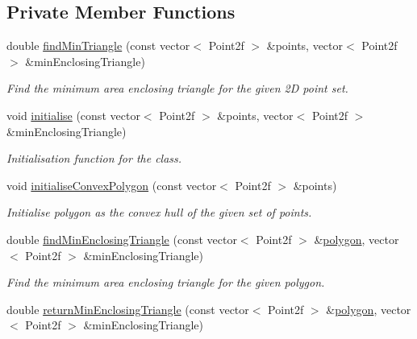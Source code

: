 \subsection*{\-Private \-Member \-Functions}
\begin{DoxyCompactItemize}
\item 
double \hyperlink{classmultiscale_1_1MinEnclosingTriangleFinder_a1540deb145740cb2e73c7c76a9dd244f}{find\-Min\-Triangle} (const vector$<$ \-Point2f $>$ \&points, vector$<$ \-Point2f $>$ \&min\-Enclosing\-Triangle)
\begin{DoxyCompactList}\small\item\em \-Find the minimum area enclosing triangle for the given 2\-D point set. \end{DoxyCompactList}\item 
void \hyperlink{classmultiscale_1_1MinEnclosingTriangleFinder_a6fa2b447626f765d0b9600cabdc810ae}{initialise} (const vector$<$ \-Point2f $>$ \&points, vector$<$ \-Point2f $>$ \&min\-Enclosing\-Triangle)
\begin{DoxyCompactList}\small\item\em \-Initialisation function for the class. \end{DoxyCompactList}\item 
void \hyperlink{classmultiscale_1_1MinEnclosingTriangleFinder_afe8fe342d7ec338ccc0874cce91f2a58}{initialise\-Convex\-Polygon} (const vector$<$ \-Point2f $>$ \&points)
\begin{DoxyCompactList}\small\item\em \-Initialise polygon as the convex hull of the given set of points. \end{DoxyCompactList}\item 
double \hyperlink{classmultiscale_1_1MinEnclosingTriangleFinder_a0b55638741cd5ff84d583df33d594a69}{find\-Min\-Enclosing\-Triangle} (const vector$<$ \-Point2f $>$ \&\hyperlink{classmultiscale_1_1MinEnclosingTriangleFinder_add5aecf2c138345091d55076bdc253a4}{polygon}, vector$<$ \-Point2f $>$ \&min\-Enclosing\-Triangle)
\begin{DoxyCompactList}\small\item\em \-Find the minimum area enclosing triangle for the given polygon. \end{DoxyCompactList}\item 
double \hyperlink{classmultiscale_1_1MinEnclosingTriangleFinder_af6e49a1ef5a0d4dbe3e25c2f92d69dc3}{return\-Min\-Enclosing\-Triangle} (const vector$<$ \-Point2f $>$ \&\hyperlink{classmultiscale_1_1MinEnclosingTriangleFinder_add5aecf2c138345091d55076bdc253a4}{polygon}, vector$<$ \-Point2f $>$ \&min\-Enclosing\-Triangle)

\end{DoxyCompactItemize}
